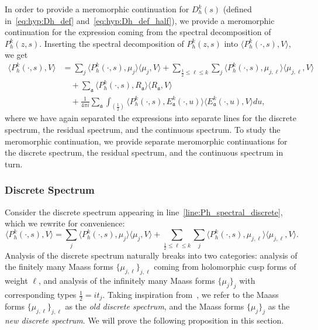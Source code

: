In order to provide a meromorphic continuation for $D_h^k(s)$ (defined
in~\eqref{eq:hyp:Dh_def} and~\eqref{eq:hyp:Dh_def_half}), we provide a meromorphic
continuation for the expression coming from the spectral decomposition of $P_h^k(z,s)$.
Inserting the spectral decomposition of $P_h^k(z,s)$ into $\langle P_h^k(\cdot, s), V
\rangle$, we get
\begin{align}
  \langle P_h^k(\cdot, s), V \rangle &= \sum_j \langle P_h^k(\cdot, s), \mu_j \rangle
  \langle \mu_j, V \rangle + \sum_{\frac{1}{2} \leq \ell \leq k} \sum_j \langle
  P_h^k(\cdot, s), \mu_{j,\ell}\rangle \langle \mu_{j,\ell}, V \rangle
  \label{line:Ph_spectral_discrete} \\
  &\quad + \sum_{\mathfrak{a}} \langle P_h^k(\cdot, s), R_\mathfrak{a}\rangle \langle
  R_\mathfrak{a}, V \rangle \label{line:Ph_spectral_residual} \\
  &\quad + \frac{1}{4\pi i} \sum_{\mathfrak{a}} \int_{(\frac{1}{2})} \langle P_h^k(\cdot,
  s), E^k_{\mathfrak{a}}(\cdot, u) \rangle \langle E^k_{\mathfrak{a}}(\cdot, u), V \rangle
  du, \label{line:Ph_spectral_continuous}
\end{align}
where we have again separated the expressions into separate lines for the discrete
spectrum, the residual spectrum, and the continuous spectrum.
To study the meromorphic continuation, we provide separate meromorphic continuations for
the discrete spectrum, the residual spectrum, and the continuous spectrum in turn.



\subsubsection*{Discrete Spectrum}

Consider the discrete spectrum appearing in line~\eqref{line:Ph_spectral_discrete}, which
we rewrite for convenience:
\begin{equation}
  \langle P_h^k(\cdot, s), V \rangle = \sum_j \langle P_h^k(\cdot, s), \mu_j \rangle
  \langle \mu_j, V \rangle + \sum_{\frac{1}{2} \leq \ell \leq k} \sum_j \langle
  P_h^k(\cdot, s), \mu_{j,\ell}\rangle \langle \mu_{j,\ell}, V \rangle.
\end{equation}
Analysis of the discrete spectrum naturally breaks into two categories: analysis of the
finitely many Maass forms $\{\mu_{j, \ell}\}_{j, \ell}$ coming from holomorphic cusp
forms of weight $\ell$, and analysis of the infinitely many Maass forms $\{\mu_j\}_{j}$
with corresponding types $\tfrac{1}{2} = it_j$.
Taking inspiration from~\cite[\S3.10]{GoldfeldHundleyI}, we refer to the Maass
forms $\{\mu_{j, \ell}\}_{j, \ell}$ as the \emph{old discrete spectrum}, and
the Maass forms $\{\mu_j\}_j$ as the \emph{new discrete spectrum}.
We will prove the following proposition in this section.


